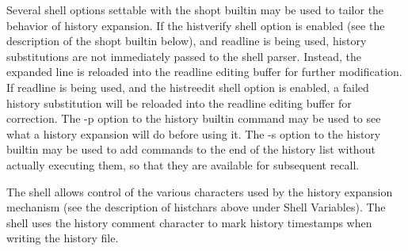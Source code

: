 Several shell options settable with the shopt builtin may be used to tailor the behavior of history expansion. If the histverify shell option is enabled (see the description of the shopt builtin below), and readline is being used, history substitutions are not immediately passed to the shell parser. Instead, the expanded line is reloaded into the readline editing buffer for further modification. If readline is being used, and the histreedit shell option is enabled, a failed history substitution will be reloaded into the readline editing buffer for correction. The -p option to the history builtin command may be used to see what a history expansion will do before using it. The -s option to the history builtin may be used to add commands to the end of the history list without actually executing them, so that they are available for subsequent recall.

The shell allows control of the various characters used by the history expansion mechanism (see the description of histchars above under Shell Variables). The shell uses the history comment character to mark history timestamps when writing the history file.
